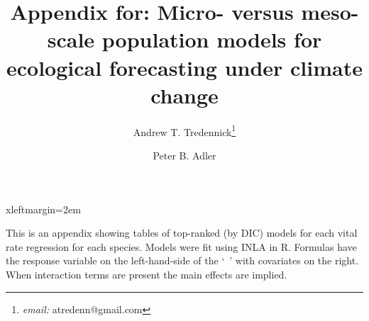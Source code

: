 \documentclass[10pt]{article}
\begin{document}



 {xleftmargin=2em}

\title{\LARGE Appendix for: Micro- versus meso-scale population models for ecological forecasting under climate change}
\author[]{\large Andrew T. Tredennick\footnote{\emph{email:} atredenn@gmail.com}}
\author[]{\large Peter B. Adler}
\maketitle

This is an appendix showing tables of top-ranked (by DIC) models for each vital rate regression for each species. Models were fit using INLA in R. Formulas have the response variable on the left-hand-side of the `~' with covariates on the right. When interaction terms are present the main effects are implied.
\end{document}
